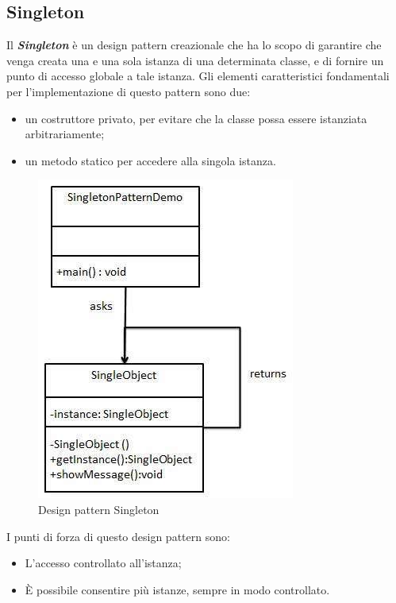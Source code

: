 \subsection{Singleton}
Il \textbf{\textit{Singleton}} è un design pattern creazionale che ha lo scopo di garantire che venga creata una e una sola istanza di una determinata classe, e di fornire un punto di accesso globale a tale istanza.
Gli elementi caratteristici fondamentali per l'implementazione di questo pattern sono due:
\begin{itemize}
	\item un costruttore privato, per evitare che la classe possa essere istanziata arbitrariamente;
	\item un metodo statico per accedere alla singola istanza.
\end{itemize}
\begin{figure}[H]
	\centering
	\includegraphics[width=0.4\linewidth]{IMG/singleton_pattern}
	\caption{Design pattern Singleton}
\end{figure}

I punti di forza di questo design pattern sono:
\begin{itemize}
	\item L'accesso controllato all'istanza;
	\item \MakeUppercase{è} possibile consentire più istanze, sempre in modo controllato.
\end{itemize}

